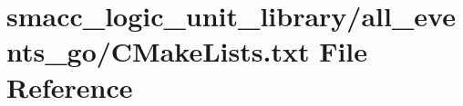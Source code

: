 \hypertarget{smacc__logic__unit__library_2all__events__go_2CMakeLists_8txt}{}\section{smacc\+\_\+logic\+\_\+unit\+\_\+library/all\+\_\+events\+\_\+go/\+C\+Make\+Lists.txt File Reference}
\label{smacc__logic__unit__library_2all__events__go_2CMakeLists_8txt}
